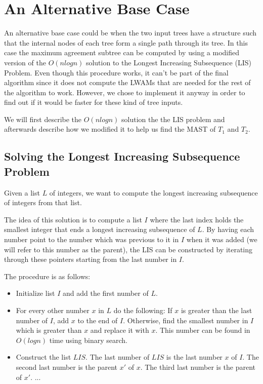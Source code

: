 \section{An Alternative Base Case}
An alternative base case could be when the two input trees have a structure such that the internal nodes of each tree form a single path through its tree. In this case the maximum agreement subtree can be computed by using a modified version of the $O(nlogn)$ solution to the Longest Increasing Subsequence (LIS) Problem. Even though this procedure works, it can't be part of the final algorithm since it does not compute the LWAMs that are needed for the rest of the algorithm to work. However, we chose to implement it anyway in order to find out if it would be faster for these kind of tree inputs.

We will first describe the $O(nlogn)$ solution the the LIS problem and afterwards describe how we modified it to help us find the MAST of $T_1$ and $T_2$.

\subsection{Solving the Longest Increasing Subsequence Problem}
Given a list $L$ of integers, we want to compute the longest increasing subsequence of integers from that list.


The idea of this solution is to compute a list $I$ where the last index holds the smallest integer that ends a longest increasing subsequence of $L$. By having each number point to the number which was previous to it in $I$ when it was added (we will refer to this number as the parent), the LIS can be constructed by iterating through these pointers starting from the last number in $I$.

The procedure is as follows:

\begin{itemize}
	\item Initialize list $I$ and add the first number of $L$.
	\item For every other number $x$ in $L$ do the following:
	\subitem If $x$ is greater than the last number of $I$, add $x$ to the end of $I$.
	\subitem Otherwise, find the smallest number in $I$ which is greater than $x$ and replace it with $x$. This number can be found in $O(logn)$ time using binary search.
	\item Construct the list $LIS$.
	\subitem The last number of $LIS$ is the last number $x$ of $I$.
	\subitem The second last number is the parent $x'$ of $x$.
	\subitem The third last number is the parent of $x'$.
	\subitem ...
\end{itemize}

